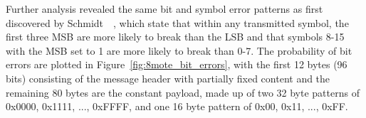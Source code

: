 Further analysis revealed the same bit and symbol error patterns as first discovered by Schmidt~\etal~\cite{Schmidt2013}, which state that within any transmitted symbol, the first three MSB are more likely to break than the LSB and that symbols 8-15 with the MSB set to 1 are more likely to break than 0-7.
The probability of bit errors are plotted in Figure~\ref{fig:8mote_bit_errors}, with the first 12 bytes (96 bits) consisting of the message header with partially fixed content and the remaining 80 bytes are the constant payload, made up of two 32 byte patterns of 0x0000, 0x1111, ..., 0xFFFF, and one 16 byte pattern of 0x00, 0x11, ..., 0xFF.

\begin{figure}[H]

\end{figure}
